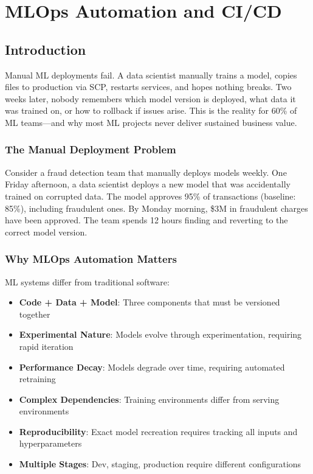 \chapter{MLOps Automation and CI/CD}

\section{Introduction}

Manual ML deployments fail. A data scientist manually trains a model, copies files to production via SCP, restarts services, and hopes nothing breaks. Two weeks later, nobody remembers which model version is deployed, what data it was trained on, or how to rollback if issues arise. This is the reality for 60\% of ML teams---and why most ML projects never deliver sustained business value.

\subsection{The Manual Deployment Problem}

Consider a fraud detection team that manually deploys models weekly. One Friday afternoon, a data scientist deploys a new model that was accidentally trained on corrupted data. The model approves 95\% of transactions (baseline: 85\%), including fraudulent ones. By Monday morning, \$3M in fraudulent charges have been approved. The team spends 12 hours finding and reverting to the correct model version.

\subsection{Why MLOps Automation Matters}

ML systems differ from traditional software:

\begin{itemize}
    \item \textbf{Code + Data + Model}: Three components that must be versioned together
    \item \textbf{Experimental Nature}: Models evolve through experimentation, requiring rapid iteration
    \item \textbf{Performance Decay}: Models degrade over time, requiring automated retraining
    \item \textbf{Complex Dependencies}: Training environments differ from serving environments
    \item \textbf{Reproducibility}: Exact model recreation requires tracking all inputs and hyperparameters
    \item \textbf{Multiple Stages}: Dev, staging, production require different configurations
\end{itemize}

